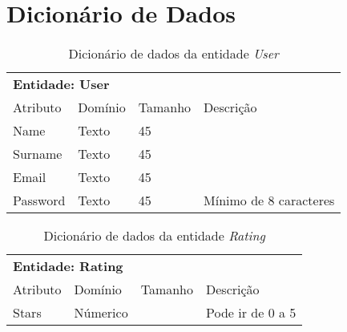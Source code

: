 \chapter{Dicionário de Dados}
\label{chap:dicionario}

\begin{table}[]
\centering
\caption{Dicionário de dados da entidade \textit{User}}
\label{my-label}
\begin{tabular}{llll}
\multicolumn{4}{l}{\textbf{Entidade: User}}                                                                                          \\
\rowcolor[HTML]{343434}
{\color[HTML]{FFFFFF} Atributo} & {\color[HTML]{FFFFFF} Domínio} & {\color[HTML]{FFFFFF} Tamanho} & {\color[HTML]{FFFFFF} Descrição} \\
Name                            & Texto                          & 45                             &                                  \\
Surname                         & Texto                          & 45                             &                                  \\
Email                           & Texto                          & 45                             &                                  \\
Password                        & Texto                          & 45                             & Mínimo de 8 caracteres
\end{tabular}
\end{table}

\begin{table}[]
\centering
\caption{Dicionário de dados da entidade \textit{Rating}}
\label{my-label}
\begin{tabular}{llll}
\multicolumn{4}{l}{\textbf{Entidade: Rating}}                                                                                        \\
\rowcolor[HTML]{343434}
{\color[HTML]{FFFFFF} Atributo} & {\color[HTML]{FFFFFF} Domínio} & {\color[HTML]{FFFFFF} Tamanho} & {\color[HTML]{FFFFFF} Descrição} \\
Stars                           & Númerico                       &                                & Pode ir de 0 a 5
\end{tabular}
\end{table}


